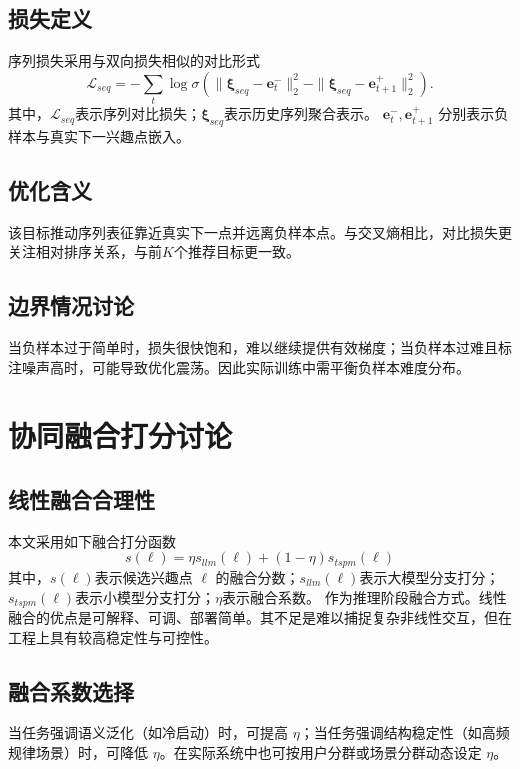 \subsection{损失定义}
序列损失采用与双向损失相似的对比形式
\begin{equation}
\mathcal{L}_{seq}=-\sum_t \log\sigma\left(\|\boldsymbol{\xi}_{seq}-\mathbf{e}_t^-\|_2^2-\|\boldsymbol{\xi}_{seq}-\mathbf{e}_{t+1}^+\|_2^2\right).
\end{equation}
其中，$\mathcal{L}_{seq}$表示序列对比损失；$\boldsymbol{\xi}_{seq}$表示历史序列聚合表示。
$\mathbf{e}_t^-,\mathbf{e}_{t+1}^+$ 分别表示负样本与真实下一兴趣点嵌入。

\subsection{优化含义}
该目标推动序列表征靠近真实下一点并远离负样本点。与交叉熵相比，对比损失更关注相对排序关系，与前$K$个推荐目标更一致。

\subsection{边界情况讨论}
当负样本过于简单时，损失很快饱和，难以继续提供有效梯度；当负样本过难且标注噪声高时，可能导致优化震荡。因此实际训练中需平衡负样本难度分布。

\section{协同融合打分讨论}
\subsection{线性融合合理性}
本文采用如下融合打分函数
\begin{equation}
s(\ell)=\eta s_{llm}(\ell)+(1-\eta)s_{tspm}(\ell)
\end{equation}
其中，$s(\ell)$表示候选兴趣点 $\ell$ 的融合分数；$s_{llm}(\ell)$表示大模型分支打分；$s_{tspm}(\ell)$表示小模型分支打分；$\eta$表示融合系数。
作为推理阶段融合方式。线性融合的优点是可解释、可调、部署简单。其不足是难以捕捉复杂非线性交互，但在工程上具有较高稳定性与可控性。

\subsection{融合系数选择}
当任务强调语义泛化（如冷启动）时，可提高 $\eta$；当任务强调结构稳定性（如高频规律场景）时，可降低 $\eta$。在实际系统中也可按用户分群或场景分群动态设定 $\eta$。

